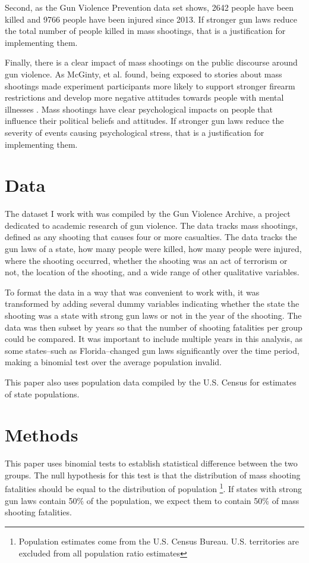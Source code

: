 \documentclass{article}
\begin{document}
Second, as the Gun Violence Prevention data set shows, 2642 people have been killed and 9766 people have been injured since 2013. If stronger gun laws reduce the total number of people killed in mass shootings, that is a justification for implementing them.

Finally, there is a clear impact of mass shootings on the public discourse around gun violence. As McGinty, et al. found, being exposed to stories about mass shootings made experiment participants more likely to support stronger firearm restrictions and develop more negative attitudes towards people with mental illnesses \cite{2}. Mass shootings have clear psychological impacts on people that influence their political beliefs and attitudes. If stronger gun laws reduce the severity of events causing psychological stress, that is a justification for implementing them.

\section{Data}
The dataset I work with was compiled by the Gun Violence Archive, a project dedicated to academic research of gun violence. The data tracks mass shootings, defined as any shooting that causes four or more casualties. The data tracks the gun laws of a state, how many people were killed, how many people were injured, where the shooting occurred, whether the shooting was an act of terrorism or not, the location of the shooting, and a wide range of other qualitative variables.

To format the data in a way that was convenient to work with, it was transformed by adding several dummy variables indicating whether the state the shooting was a state with strong gun laws or not in the year of the shooting. The data was then subset by years so that the number of shooting fatalities per group could be compared. It was important to include multiple years in this analysis, as some states--such as Florida--changed gun laws significantly over the time period, making a binomial test over the average population invalid. 

This paper also uses population data compiled by the U.S. Census for estimates of state populations. 

\section{Methods}

This paper uses binomial tests to establish statistical difference between the two groups. The null hypothesis for this test is that the distribution of mass shooting fatalities should be equal to the distribution of population \footnote{Population estimates come from the U.S. Census Bureau. U.S. territories are excluded from all population ratio estimates}. If states with strong gun laws contain 50$\%$ of the population, we expect them to contain 50$\%$ of mass shooting fatalities.
\end{document}
